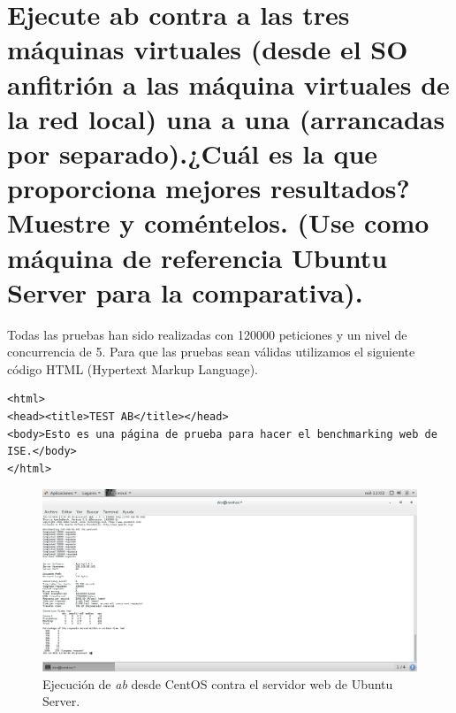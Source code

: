 \section{Ejecute ab contra a las tres máquinas virtuales (desde el SO anfitrión a las máquina virtuales de la red local) una a una (arrancadas por separado).¿Cuál es la que proporciona mejores resultados? Muestre y coméntelos. (Use como máquina de referencia Ubuntu Server para la comparativa).}
Todas las pruebas han sido realizadas con 120000 peticiones y un nivel de concurrencia de 5. Para que las pruebas sean válidas utilizamos el siguiente código HTML (Hypertext Markup Language).

\begin{verbatim}
<html>
<head><title>TEST AB</title></head>
<body>Esto es una página de prueba para hacer el benchmarking web de ISE.</body>
</html>
\end{verbatim}
\begin{figure}[H]
	\centering
	\includegraphics[scale=0.6]{abUbuntu.png}
	\caption{Ejecución de \textit{ab} desde CentOS contra el servidor web de Ubuntu Server.}
\end{figure}

